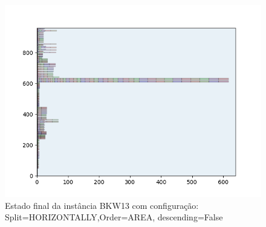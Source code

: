 \begin{figure}[H]
    \centering
    \caption[]{Estado final da instância BKW13 com configuração: Split=HORIZONTALLY,Order=AREA, descending=False}
    \label{fig:bkw13-horizontally-area-false}
    \includegraphics[scale=0.5]{output/figures/bkw/bkw13/horizontally/area/false/0000}
\end{figure}